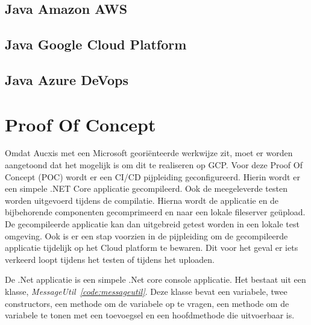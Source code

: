 \subsection{Java Amazon AWS}
\label{sec:JAA}


\subsection{Java Google Cloud Platform}
\label{sec:JGCP}

\subsection{Java Azure DeVops}
\label{sec:JAD}

\section{Proof Of Concept}
\label{sec:POC}
Omdat Aucxis met een Microsoft georiënteerde werkwijze zit, moet er worden aangetoond dat het mogelijk is om dit te realiseren op GCP. Voor deze Proof Of Concept (POC) wordt er een CI/CD pijpleiding geconfigureerd. Hierin wordt er een simpele .NET Core applicatie gecompileerd. Ook de meegeleverde testen worden uitgevoerd tijdens de compilatie. Hierna wordt de applicatie en de bijbehorende componenten gecomprimeerd en naar een lokale fileserver geüpload. De gecompileerde applicatie kan dan uitgebreid getest worden in een lokale test omgeving. Ook is er een stap voorzien in de pijpleiding om de gecompileerde applicatie tijdelijk op het Cloud platform te bewaren. Dit voor het geval er iets verkeerd loopt tijdens het testen of tijdens het uploaden.

De .Net applicatie is een simpele .Net core console applicatie. Het bestaat uit een klasse, \emph{MessageUtil~\ref{code:messageutil}}. Deze klasse bevat een variabele, twee constructors, een methode om de variabele op te vragen, een methode om de variabele te tonen met een toevoegsel en een hoofdmethode die uitvoerbaar is.

